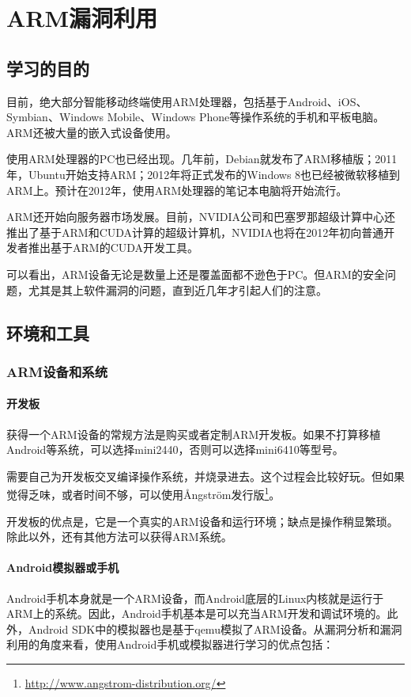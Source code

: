 \chapter{ARM漏洞利用}
\label{Chap:arm}
\section{学习的目的}
目前，绝大部分智能移动终端使用ARM处理器，包括基于Android、iOS、Symbian、Windows Mobile、Windows Phone等操作系统的手机和平板电脑。ARM还被大量的嵌入式设备使用。

使用ARM处理器的PC也已经出现。几年前，Debian就发布了ARM移植版；2011年，Ubuntu开始支持ARM；2012年将正式发布的Windows 8也已经被微软移植到ARM上。预计在2012年，使用ARM处理器的笔记本电脑将开始流行。

ARM还开始向服务器市场发展。目前，NVIDIA公司和巴塞罗那超级计算中心还推出了基于ARM和CUDA计算的超级计算机，NVIDIA也将在2012年初向普通开发者推出基于ARM的CUDA开发工具。

可以看出，ARM设备无论是数量上还是覆盖面都不逊色于PC。但ARM的安全问题，尤其是其上软件漏洞的问题，直到近几年才引起人们的注意。
\section{环境和工具}
\subsection{ARM设备和系统}
\subsubsection{开发板}
获得一个ARM设备的常规方法是购买或者定制ARM开发板。如果不打算移植Android等系统，可以选择mini2440，否则可以选择mini6410等型号。

需要自己为开发板交叉编译操作系统，并烧录进去。这个过程会比较好玩。但如果觉得乏味，或者时间不够，可以使用Ångström发行版\footnote{\url{http://www.angstrom-distribution.org/}}。

开发板的优点是，它是一个真实的ARM设备和运行环境；缺点是操作稍显繁琐。除此以外，还有其他方法可以获得ARM系统。

\subsubsection{Android模拟器或手机}
Android手机本身就是一个ARM设备，而Android底层的Linux内核就是运行于ARM上的系统。因此，Android手机基本是可以充当ARM开发和调试环境的。此外，Android SDK中的模拟器也是基于qemu模拟了ARM设备。从漏洞分析和漏洞利用的角度来看，使用Android手机或模拟器进行学习的优点包括：

